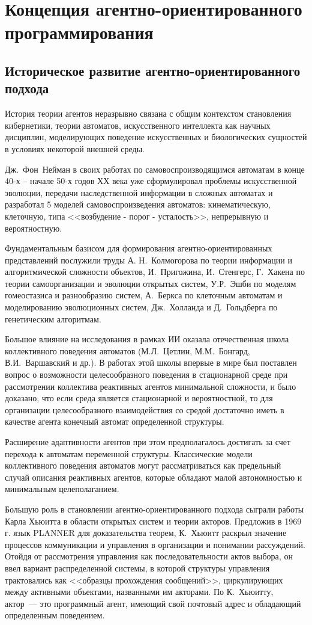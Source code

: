 \section{Концепция агентно-ориентированного программирования}
\subsection{Историческое развитие агентно-ориентированного подхода}
История теории агентов неразрывно связана с общим контекстом становления кибернетики, теории автоматов, искусственного интеллекта как научных дисциплин, моделирующих поведение искусственных и биологических сущностей в условиях некоторой внешней среды.

Дж.~Фон~Нейман в своих работах по самовоспроизводящимся автоматам в конце 40-х -- начале 50-х годов ХХ века уже сформулировал проблемы искусственной эволюции, передачи наследственной информации в сложных автоматах и разработал 5 моделей самовоспроизведения автоматов: кинематическую, клеточную, типа <<возбудение - порог - усталость>>, непрерывную и вероятностную.

Фундаментальным базисом для формирования агентно-ориентированных представлений послужили труды А. Н.~Колмогорова по теории информации и алгоритмической сложности объектов, И.~Пригожина, И.~Стенгерс, Г.~Хакена по теории самоорганизации и эволюции открытых систем, У.Р.~Эшби по моделям гомеостазиса и разнообразию систем, А.~Беркса по клеточным автоматам и моделированию эволюционных систем, Дж.~Холланда и Д.~Гольдберга по генетическим алгоритмам.

Большое влияние на исследования в рамках ИИ оказала отечественная школа коллективного поведения автоматов (М.Л.~Цетлин, М.М.~Бонгард, В.И.~Варшавский и др.). В работах этой школы впервые в мире был поставлен вопрос о возможности целесообразного поведения в стационарной среде при рассмотрении коллектива реактивных агентов минимальной сложности, и было доказано, что если среда является стационарной и вероятностной, то для организации целесообразного взаимодействия со средой достаточно иметь в качестве агента конечный автомат определенной структуры.

Расширение адаптивности агентов при этом предполагалось достигать за счет перехода к автоматам переменной структуры. Классические модели коллективного поведения автоматов могут рассматриваться как предельный случай описания реактивных агентов, которые обладают малой автономностью и минимальным целеполаганием.

Большую роль в становлении агентно-ориентированного подхода сыграли работы Карла Хьюитта в области открытых систем и теории акторов. Предложив в 1969 г. язык PLANNER для доказательства теорем, К.~Хьюитт раскрыл значение процессов коммуникации и управления в организации и понимании рассуждений. Отойдя от рассмотрения управления как последовательности актов выбора, он ввел вариант распределенной системы, в которой структуры управления трактовались как <<образцы прохождения сообщений>>, циркулирующих между активными объектами, названными им акторами. По К.~Хьюитту, актор~--- это программный агент, имеющий свой почтовый адрес и обладающий определенным поведением.

